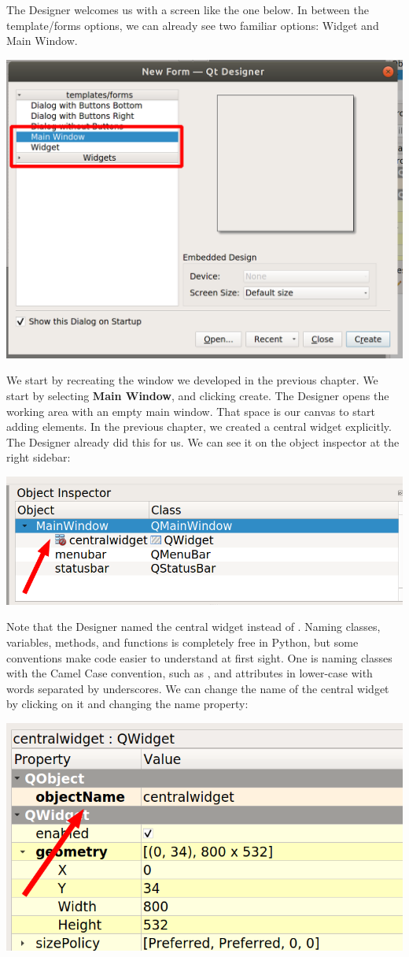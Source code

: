 The Designer welcomes us with a screen like the one below. In between the template/forms options, we can already see two familiar options: Widget and Main Window.

\begin{center}
    \includegraphics[width=.5\textwidth]{images/Chapter_09/01_Designer_Welcome.png}
\end{center}

We start by recreating the window we developed in the previous chapter. We start by selecting \textbf{Main Window}, and clicking create. The Designer opens the working area with an empty main window. That space is our canvas to start adding elements. In the previous chapter, we created a central widget explicitly. The Designer already did this for us. We can see it on the object inspector at the right sidebar:

\begin{center}
    \includegraphics[width=.5\textwidth]{images/Chapter_09/02_central_widget.png}
\end{center}

Note that the Designer named the central widget  instead of . Naming classes, variables, methods, and functions is completely free in Python, but some conventions make code easier to understand at first sight. One is naming classes with the Camel Case convention, such as , and attributes in lower-case with words separated by underscores. We can change the name of the central widget by clicking on it and changing the  name property:

\begin{center}
    \includegraphics[width=.5\textwidth]{images/Chapter_09/03_central_widget_name.png}
\end{center}

